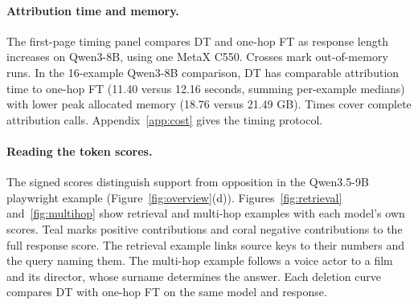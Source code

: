 \paragraph{Attribution time and memory.}
The first-page timing panel compares DT and one-hop FT as response length increases on Qwen3-8B, using one MetaX C550. Crosses mark out-of-memory runs. In the 16-example Qwen3-8B comparison, DT has comparable attribution time to one-hop FT (11.40 versus 12.16 seconds, summing per-example medians) with lower peak allocated memory (18.76 versus 21.49 GB). Times cover complete attribution calls. Appendix~\ref{app:cost} gives the timing protocol.

\paragraph{Reading the token scores.}
The signed scores distinguish support from opposition in the Qwen3.5-9B playwright example (Figure~\ref{fig:overview}(d)). Figures~\ref{fig:retrieval} and~\ref{fig:multihop} show retrieval and multi-hop examples with each model's own scores. Teal marks positive contributions and coral negative contributions to the full response score. The retrieval example links source keys to their numbers and the query naming them. The multi-hop example follows a voice actor to a film and its director, whose surname determines the answer. Each deletion curve compares DT with one-hop FT on the same model and response.
